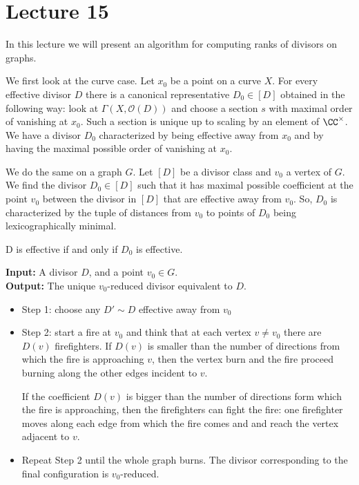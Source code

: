 \section{Lecture 15}
In this lecture we will present an algorithm for computing ranks of divisors on graphs. 

We first look at the curve case. Let $x_0$ be a point on a curve $X$. For every effective divisor $D$ there is a canonical representative $D_0 \in [D]$ obtained in the following way: look at $\Gamma(X, \mathcal{O}(D))$ and choose a section $s$ with maximal order of vanishing at $x_0$. Such a section is unique up to scaling by an element of $\CC^{\times}$. We have a divisor $D_0$ characterized by being effective away from $x_0$ and by having the maximal possible order of vanishing at $x_0$. 

We do the same on a graph $G$. Let $[D]$ be a divisor class and $v_0$ a vertex of $G$. We find the divisor $D_0\in [D]$ such that it has maximal possible coefficient at the point $v_0$ between the divisor in $[D]$ that are effective away from $v_0$. So, $D_0$ is characterized by the tuple of distances from $v_0$ to points of $D_0$ being lexicographically minimal.

\begin{proposition} D is effective if and only if $D_0$ is effective. \end{proposition}

\begin{algorithm}   
{\bf Input:} A divisor $D$, and a point $v_0 \in G$. \\
{\bf Output:} The unique $v_0$-reduced divisor equivalent to $D$.
\begin{itemize}
\item Step 1: choose any $D' \sim D$ effective away from $v_0$ 
\item Step 2: start a fire at $v_0$ and think that at each vertex $v \not = v_0$ there are $D(v)$ firefighters. If $D(v)$ is smaller than the number of directions from which the fire is approaching $v$, then the vertex burn and the fire proceed burning along the other edges incident to $v$. 

If the coefficient $D(v)$ is bigger than the number of directions form which the fire is approaching, then the firefighters can fight the fire: one firefighter moves along each edge from which the fire comes and and reach the vertex adjacent to $v$. 
\item Repeat Step 2 until the whole graph burns. The divisor corresponding to the final configuration is $v_0$-reduced. 
\end{itemize}
\end{algorithm}

